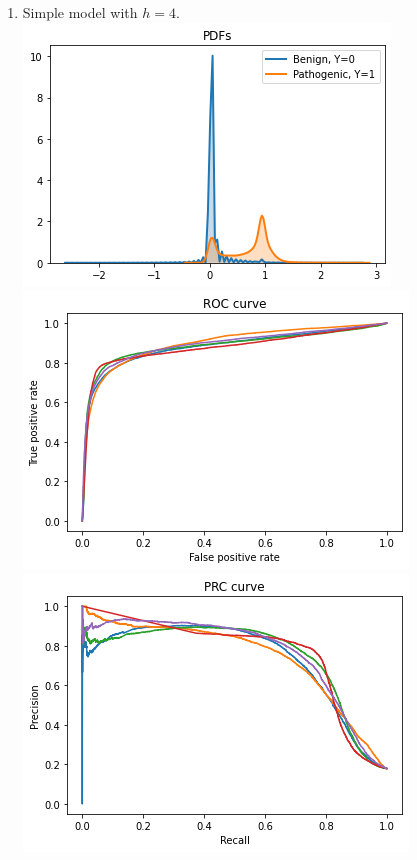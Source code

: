 \documentclass[twoside]{article}
\begin{document}
\begin{enumerate}
		\item Simple model with $h = 4$.\\
		\includegraphics[scale=0.7]{res/img/s4pdf.png}\\
		\includegraphics[scale=0.7]{res/img/s4roc.png}\\
		\includegraphics[scale=0.7]{res/img/s4prc.png}\\
		

\end{enumerate}
\end{document}
